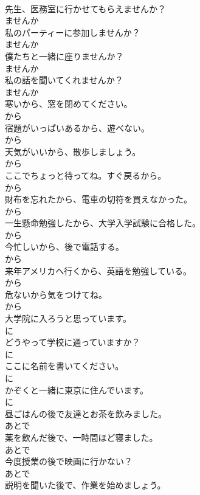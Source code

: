 \documentclass[8pt]{extreport}
\begin{document}
\begin{CJK}{UTF8}{min}
\\	先生、医務室に行かせてもらえませんか？	
\\	ませんか
\\	私のパーティーに参加しませんか？	
\\	ませんか
\\	僕たちと一緒に座りませんか？	
\\	ませんか
\\	私の話を聞いてくれませんか？	
\\	ませんか
\\	寒いから、窓を閉めてください。	
\\	から
\\	宿題がいっぱいあるから、遊べない。	
\\	から
\\	天気がいいから、散歩しましょう。	
\\	から
\\	ここでちょっと待ってね。すぐ戻るから。	
\\	から
\\	財布を忘れたから、電車の切符を買えなかった。	
\\	から
\\	一生懸命勉強したから、大学入学試験に合格した。	
\\	から
\\	今忙しいから、後で電話する。	
\\	から
\\	来年アメリカへ行くから、英語を勉強している。	
\\	から
\\	危ないから気をつけてね。	
\\	から
\\	大学院に入ろうと思っています。	
\\	に
\\	どうやって学校に通っていますか？	
\\	に
\\	ここに名前を書いてください。	
\\	に
\\	かぞくと一緒に東京に住んでいます。	
\\	に
\\	昼ごはんの後で友達とお茶を飲みました。	
\\	あとで
\\	薬を飲んだ後で、一時間ほど寝ました。	
\\	あとで
\\	今度授業の後で映画に行かない？	
\\	あとで
\\	説明を聞いた後で、作業を始めましょう。	

\end{CJK}
\end{document}
